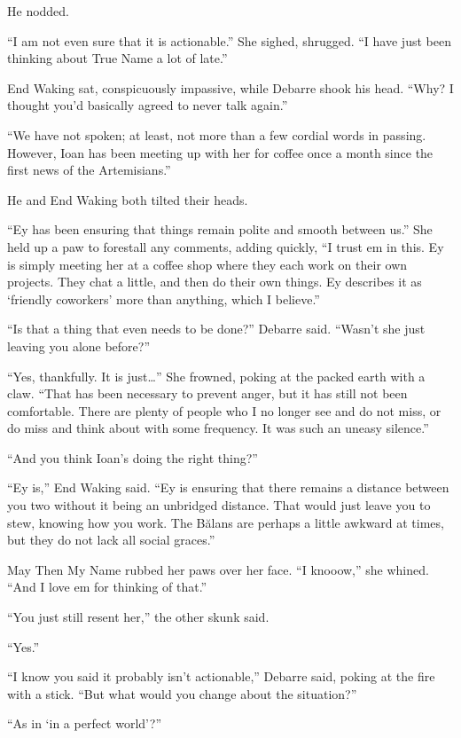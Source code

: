 He nodded.

``I am not even sure that it is actionable.'' She sighed, shrugged. ``I have just been thinking about True Name a lot of late.''

End Waking sat, conspicuously impassive, while Debarre shook his head. ``Why? I thought you'd basically agreed to never talk again.''

``We have not spoken; at least, not more than a few cordial words in passing. However, Ioan has been meeting up with her for coffee once a month since the first news of the Artemisians.''

He and End Waking both tilted their heads.

``Ey has been ensuring that things remain polite and smooth between us.'' She held up a paw to forestall any comments, adding quickly, ``I trust em in this. Ey is simply meeting her at a coffee shop where they each work on their own projects. They chat a little, and then do their own things. Ey describes it as `friendly coworkers' more than anything, which I believe.''

``Is that a thing that even needs to be done?'' Debarre said. ``Wasn't she just leaving you alone before?''

``Yes, thankfully. It is just\ldots{}'' She frowned, poking at the packed earth with a claw. ``That has been necessary to prevent anger, but it has still not been comfortable. There are plenty of people who I no longer see and do not miss, or do miss and think about with some frequency. It was such an uneasy silence.''

``And you think Ioan's doing the right thing?''

``Ey is,'' End Waking said. ``Ey is ensuring that there remains a distance between you two without it being an unbridged distance. That would just leave you to stew, knowing how you work. The Bălans are perhaps a little awkward at times, but they do not lack all social graces.''

May Then My Name rubbed her paws over her face. ``I knooow,'' she whined. ``And I love em for thinking of that.''

``You just still resent her,'' the other skunk said.

``Yes.''

``I know you said it probably isn't actionable,'' Debarre said, poking at the fire with a stick. ``But what would you change about the situation?''

``As in `in a perfect world'?''

